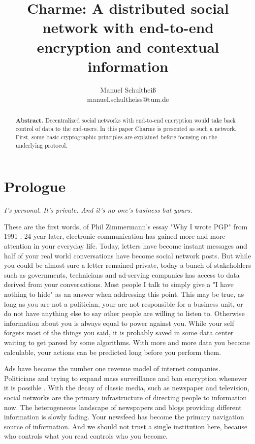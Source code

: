 \documentclass{scrartcl}
\title{Charme: A distributed social network with end-to-end encryption and contextual information}
\author{Manuel Schultheiß\\manuel.schultheiss@tum.de}
\begin{document}
  \sloppy %
 
\maketitle

\begin{abstract}
\noindent
  \textbf{Abstract.} 
  Decentralized social networks with end-to-end encryption would take back control of data to the end-users. In this paper Charme is presented as such a network. First, some  basic cryptographic  principles are explained before focusing on the underlying  protocol.
  \end{abstract}
  
  
\tableofcontents
 \newpage
\section{Prologue}

\begin{center}
\textit{I's personal. It's private.
And it's no one's business but yours.}
\end{center}

These are the first words, of Phil Zimmermann's essay "Why I wrote PGP" from 1991 \cite{PHIL}. 24 year later, electronic communication has gained more and more attention in your everyday life. Today, letters have become instant messages and half of your real world conversations have become social network posts. But while you could be almost sure a letter remained private, today a bunch of stakeholders such as governments, technicians and ad-serving companies has access to data derived from your conversations. 
Most people I talk to simply give a "I have nothing to hide" as an answer when addressing this point. This may be true, as long as you are not a politician, your are not responsible for a business unit, or do not have anything else to say other people are willing to listen to. Otherwise information about you is always equal to power against you. While your self forgets most of the things you said, it is probably saved in some data center waiting to get parsed by some algorithms. With more and more data you become calculable, your actions can be predicted long before you perform them.

 Ads have become the number one revenue model of internet companies. 
Politicians and trying to expand mass surveillance and ban encryption whenever it is possible \cite{EFF}. With the decay of classic media, such as newspaper and television, social networks are the primary infrastructure of directing people to information now. The heterogeneous  landscape of newspapers and blogs providing different information is slowly fading. Your newsfeed has become the primary navigation source of information. And we should not trust a single institution  here, because who controls what you read controls who you become.
\end{document}
